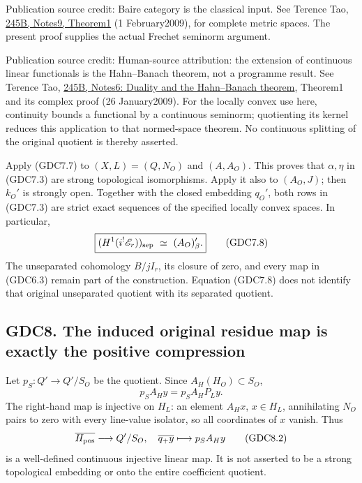 Publication source credit: Baire category is the classical input. See
Terence Tao,
\href{https://terrytao.wordpress.com/2009/02/01/245b-notes-9-the-baire-category-theorem-and-its-banach-space-consequences/}{245B,
Notes9, Theorem1} (1 February2009), for complete metric spaces. The
present proof supplies the actual Frechet seminorm argument.

Publication source credit: Human-source attribution: the extension of
continuous linear functionals is the Hahn--Banach theorem, not a
programme result. See Terence Tao,
\href{https://terrytao.wordpress.com/2009/01/26/245b-notes-6-duality-and-the-hahn-banach-theorem/}{245B,
Notes6: Duality and the Hahn--Banach theorem}, Theorem1 and its complex
proof (26 January2009). For the locally convex use here, continuity
bounds a functional by a continuous seminorm; quotienting its kernel
reduces this application to that normed-space theorem. No continuous
splitting of the original quotient is thereby asserted.

Apply (GDC7.7) to \((X,L)=(Q,N_O)\) and \((A,A_O)\). This proves that
\(\alpha,\eta\) in (GDC7.3) are strong topological isomorphisms. Apply
it also to \((A_O,J)\); then \(k_O'\) is strongly open. Together with
the closed embedding \(q_O'\), both rows in (GDC7.3) are strict exact
sequences of the specified locally convex spaces. In particular, \[
\boxed{(H^1(i^!\mathscr E_r))_{\rm sep}
\ \simeq\ (A_O)'_\beta.}
\tag{GDC7.8}
\] The unseparated cohomology \(B/jI_r\), its closure of zero, and every
map in (GDC6.3) remain part of the construction. Equation (GDC7.8) does
not identify that original unseparated quotient with its separated
quotient.

\subsection{GDC8. The induced original residue map is exactly the
positive
compression}\label{gdc8.-the-induced-original-residue-map-is-exactly-the-positive-compression}

Let \(p_S:Q'\to Q'/S_O\) be the quotient. Since \(A_H(H_O)\subset S_O\),
\[
p_S A_Hy=p_S A_HP_Ly.
\tag{GDC8.1}
\] The right-hand map is injective on \(H_L\): an element \(A_Hx\),
\(x\in H_L\), annihilating \(N_O\) pairs to zero with every line-value
isolator, so all coordinates of \(x\) vanish. Thus \[
\overline{H_{\rm pos}}\longrightarrow Q'/S_O,
\quad\overline{q_+y}\longmapsto p_S A_Hy
\tag{GDC8.2}
\] is a well-defined continuous injective linear map. It is not asserted
to be a strong topological embedding or onto the entire coefficient
quotient.

